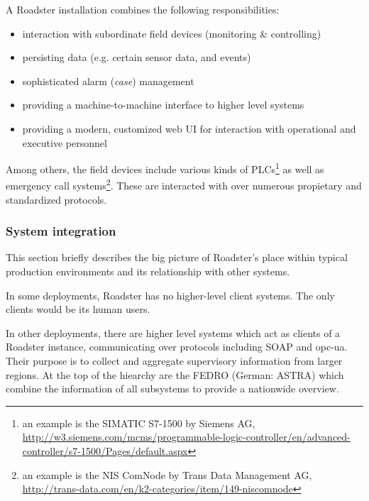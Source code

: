 A Roadster installation combines the following responsibilities:

\begin{itemize}
	\item interaction with subordinate field devices (monitoring \& controlling)
	\item persisting data (e.g. certain sensor data, and events)
	\item sophisticated alarm (\emph{case}) management
	\item providing a machine-to-machine interface to higher level systems
	\item providing a modern, customized web UI for interaction with operational and executive personnel
\end{itemize}

Among others, the field devices include various kinds of \glspl{PLC}\footnote{an example
is the SIMATIC S7-1500 by Siemens AG,
\url{http://w3.siemens.com/mcms/programmable-logic-controller/en/advanced-controller/s7-1500/Pages/default.aspx}}
as well as emergency call systems\footnote{an example is the NIS ComNode by Trans Data
Management AG,
\url{http://trans-data.com/en/k2-categories/item/149-niscomnode}}.
These are interacted with over numerous propietary and standardized protocols.

\subsubsection{System integration}
This section briefly describes the big picture of Roadster's place within
typical production environments and its relationship with other systems.

In some deployments, Roadster has no higher-level client systems. The only
clients would be its human users. %

In other deployments, there are higher level systems which act as clients of a Roadster instance, communicating over
protocols including \gls{SOAP} and \gls{opc-ua}. Their purpose is to
collect and aggregate supervisory information from larger regions. At the top of the
hiearchy are the \gls{FEDRO} (German: \gls{ASTRA}) which combine the information of all
subsystems to provide a nationwide overview.

